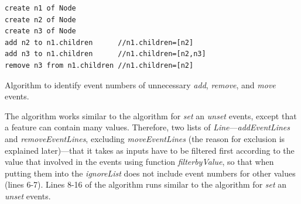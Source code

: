 \documentclass{llncs}
\begin{document}
\begin{lstlisting}[style=eol,caption={Example of CBP representation of attribute \emph{values}'s add and remove operations.},label=lst:add_remove_move_reference]
create n1 of Node
create n2 of Node
create n3 of Node
add n2 to n1.children      //n1.children=[n2] 
add n3 to n1.children      //n1.children=[n2,n3] 
remove n3 from n1.children //n1.children=[n2] 
\end{lstlisting}

\begin{algorithm}[H]
\begin{small}
\end{small}
\caption{Algorithm to identify event numbers of unnecessary \emph{add}, \emph{remove}, and \emph{move} events.}
\label{alg:add_remove_move_optimisation}
\end{algorithm}

The algorithm works similar to the algorithm for \emph{set} an \emph{unset} events, except that a feature can contain many values. Therefore, two lists of \emph{Line}---\emph{addEventLines} and \emph{removeEventLines}, excluding \emph{moveEventLines} (the reason for exclusion is explained later)---that it takes as inputs have to be filtered first according to the value that involved in the events using function \emph{filterbyValue}, so that when putting them into the \emph{ignoreList} does not include event numbers for other values (lines 6-7). Lines 8-16 of the algorithm runs similar to the algorithm for \emph{set} an \emph{unset} events. 
 
\end{document}

